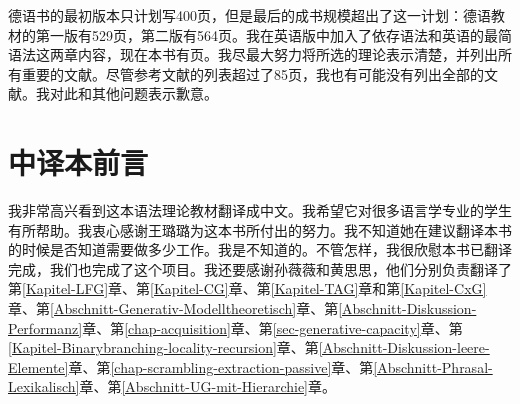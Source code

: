 德语书的最初版本只计划写400页，但是最后的成书规模超出了这一计划：德语教材的第一版有529页，第二版有564页。我在英语版中加入了依存语法和英语的最简语法这两章内容，现在本书有\pageref{LastPage}页。我尽最大努力将所选的理论表示清楚，并列出所有重要的文献。尽管参考文献的列表超过了85页，我也有可能没有列出全部的文献。我对此和其他问题表示歉意。







\section*{中译本前言}

我非常高兴看到这本语法理论教材翻译成中文。我希望它对很多语言学专业的学生有所帮助。我衷心感谢王璐璐为这本书所付出的努力。我不知道她在建议翻译本书的时候是否知道需要做多少工作。我是不知道的。不管怎样，我很欣慰本书已翻译完成，我们也完成了这个项目。我还要感谢孙薇薇和黄思思，他们分别负责翻译了第\ref{Kapitel-LFG}章、第\ref{Kapitel-CG}章、第\ref{Kapitel-TAG}章和第\ref{Kapitel-CxG}章、第\ref{Abschnitt-Generativ-Modelltheoretisch}章、第\ref{Abschnitt-Diskussion-Performanz}章、第\ref{chap-acquisition}章、第\ref{sec-generative-capacity}章、第\ref{Kapitel-Binarybranching-locality-recursion}章、第\ref{Abschnitt-Diskussion-leere-Elemente}章、第\ref{chap-scrambling-extraction-passive}章、第\ref{Abschnitt-Phrasal-Lexikalisch}章、第\ref{Abschnitt-UG-mit-Hierarchie}章。

